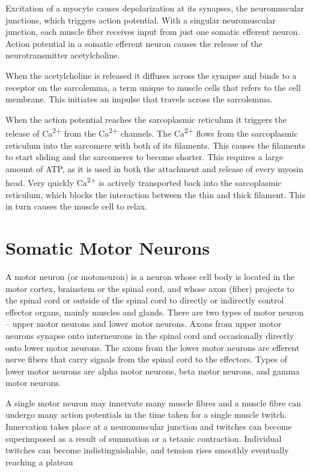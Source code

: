 \documentclass[]{book}
\begin{document}
Excitation of a myocyte causes depolarization at its synapses, the neuromuscular junctions, which triggers action potential. With a singular neuromuscular junction, each muscle fiber receives input from just one somatic efferent neuron. Action potential in a somatic efferent neuron causes the release of the neurotransmitter acetylcholine.

When the acetylcholine is released it diffuses across the synapse and binds to a receptor on the sarcolemma, a term unique to muscle cells that refers to the cell membrane. This initiates an impulse that travels across the sarcolemma.

When the action potential reaches the sarcoplasmic reticulum it triggers the release of Ca\textsuperscript{2+} from the Ca\textsuperscript{2+} channels. The Ca\textsuperscript{2+} flows from the sarcoplasmic reticulum into the sarcomere with both of its filaments. This causes the filaments to start sliding and the sarcomeres to become shorter. This requires a large amount of ATP, as it is used in both the attachment and release of every myosin head. Very quickly Ca\textsuperscript{2+} is actively transported back into the sarcoplasmic reticulum, which blocks the interaction between the thin and thick filament. This in turn causes the muscle cell to relax.

\hypertarget{somatic-motor-neurons}{%
\section{Somatic Motor Neurons}\label{somatic-motor-neurons}}

A motor neuron (or motoneuron) is a neuron whose cell body is located in the motor cortex, brainstem or the spinal cord, and whose axon (fiber) projects to the spinal cord or outside of the spinal cord to directly or indirectly control effector organs, mainly muscles and glands. There are two types of motor neuron -- upper motor neurons and lower motor neurons. Axons from upper motor neurons synapse onto interneurons in the spinal cord and occasionally directly onto lower motor neurons. The axons from the lower motor neurons are efferent nerve fibers that carry signals from the spinal cord to the effectors. Types of lower motor neurons are alpha motor neurons, beta motor neurons, and gamma motor neurons.

A single motor neuron may innervate many muscle fibres and a muscle fibre can undergo many action potentials in the time taken for a single muscle twitch. Innervation takes place at a neuromuscular junction and twitches can become superimposed as a result of summation or a tetanic contraction. Individual twitches can become indistinguishable, and tension rises smoothly eventually reaching a plateau
\end{document}
